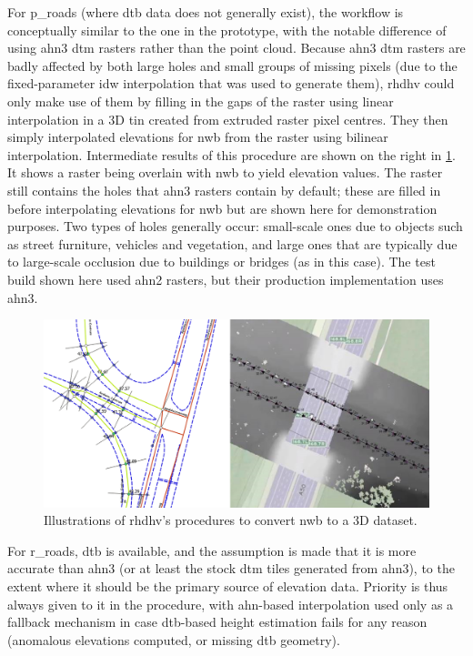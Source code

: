 For \ac{p_roads} (where \ac{dtb} data does not generally exist), the workflow is conceptually similar to the one in the prototype, with the notable difference of using \ac{ahn3} \ac{dtm} rasters rather than the point cloud. Because \ac{ahn3} \ac{dtm} rasters are badly affected by both large holes and small groups of missing pixels (due to the fixed-parameter \ac{idw} interpolation that was used to generate them), \ac{rhdhv} could only make use of them by filling in the gaps of the raster using linear interpolation in a 3D \ac{tin} created from extruded raster pixel centres. They then simply interpolated elevations for \ac{nwb} from the raster using bilinear interpolation. Intermediate results of this procedure are shown on the right in \ref{fig:rhdhv}. It shows a raster being overlain with \ac{nwb} to yield elevation values. The raster still contains the holes that \ac{ahn3} rasters contain by default; these are filled in before interpolating elevations for \ac{nwb} but are shown here for demonstration purposes. Two types of holes generally occur: small-scale ones due to objects such as street furniture, vehicles and vegetation, and large ones that are typically due to large-scale occlusion due to buildings or bridges (as in this case). The test build shown here used \ac{ahn2} rasters, but their production implementation uses \ac{ahn3}.

\begin{figure}
    \centering
    \includegraphics[width=\linewidth]{final_report/figs/rhdhv_combined.png}
    \caption{Illustrations of \ac{rhdhv}'s procedures to convert \ac{nwb} to a 3D dataset.}
    \label{fig:rhdhv}
\end{figure}

For \ac{r_roads}, \ac{dtb} is available, and the assumption is made that it is more accurate than \ac{ahn3} (or at least the stock \ac{dtm} tiles generated from \ac{ahn3}), to the extent where it should be the primary source of elevation data. Priority is thus always given to it in the procedure, with \ac{ahn}-based interpolation used only as a fallback mechanism in case \ac{dtb}-based height estimation fails for any reason (anomalous elevations computed, or missing \ac{dtb} geometry).

